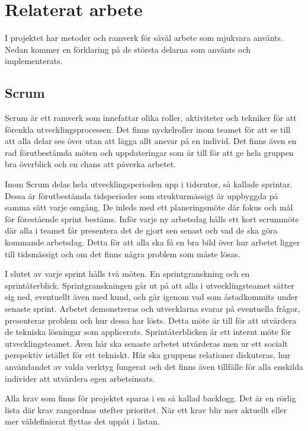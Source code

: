 \chapter{Relaterat arbete}
I projektet har metoder och ramverk för såväl arbete som mjukvara använts. Nedan kommer en förklaring på de största delarna som använts och implementerats.

\section{Scrum}
Scrum är ett ramverk som innefattar olika roller, aktiviteter och tekniker för att förenkla utvecklingsprocessen. Det finns nyckelroller inom teamet för att se till att alla delar ses över utan att lägga allt ansvar på en individ. Det finns även en rad förutbestämda möten och uppdateringar som är till för att ge hela gruppen bra överblick och en chans att påverka arbetet.

Inom Scrum delas hela utvecklingsperioden upp i tidsrutor, så kallade sprintar. Dessa är förutbestämda tidsperioder som strukturmässigt är uppbyggda på samma sätt varje omgång. De inleds med ett planeringsmöte där fokus och mål för förestående sprint bestäms. Inför varje ny arbetsdag hålls ett kort scrummöte där alla i teamet får presentera det de gjort sen senast och vad de ska göra kommande arbetsdag. Detta för att alla ska få en bra bild över hur arbetet ligger till tidsmässigt och om det finns några problem som måste lösas. 

I slutet av varje sprint hålls två möten. En sprintgranskning och en sprintåterblick. Sprintgranskningen går ut på att alla i utvecklingsteamet sätter sig ned, eventuellt även med kund, och går igenom vad som åstadkommits under senaste sprint. Arbetet demonstreras och utvecklarna svarar på eventuella frågor, presenterar problem och hur dessa har lösts. Detta möte är till för att utvärdera de tekniska lösningar som applicerats. Sprintåterblicken är ett internt möte för utvecklingsteamet. Även här ska senaste arbetet utvärderas men ur ett socialt perspektiv istället för ett tekniskt. Här ska gruppens relationer diskuteras, hur användandet av valda verktyg fungerat och det finns även tillfälle för alla enskilda individer att utvärdera egen arbetsinsats.

Alla krav som finns för projektet sparas i en så kallad backlogg. Det är en rörlig lista där krav rangordnas utefter prioritet. När ett krav blir mer aktuellt eller mer väldefinierat flyttas det uppåt i listan. \cite{scrumguide}

